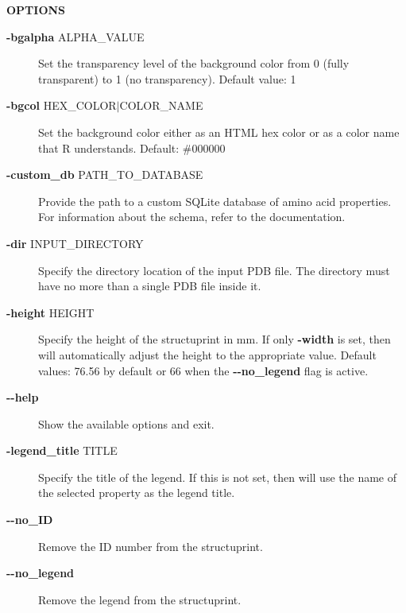 \documentclass[12pt,a4paper]{article}
\begin{document}
\textbf{\large{OPTIONS}}
\begin{description}

\item[{\textbf{-bgalpha} ALPHA\_VALUE}] \mbox{}

Set the transparency level of the background color from 0 (fully transparent) to 1 (no transparency). Default value: 1

\item[{\textbf{-bgcol} HEX\_COLOR$|$COLOR\_NAME}] \mbox{}

Set the background color either as an HTML hex color or as a color name that R understands. Default: \#000000

\item[{\textbf{-custom\_db} PATH\_TO\_DATABASE}] \mbox{}

Provide the path to a custom SQLite database of amino acid properties. For information about the schema, refer to the documentation.

\item[{\textbf{-dir} INPUT\_DIRECTORY}] \mbox{}

Specify the directory location of the input PDB file. The directory must have no more than a single PDB file inside it.

\item[{\textbf{-height} HEIGHT}] \mbox{}

Specify the height of the structuprint in mm. If only \textbf{-width} is set, then  will automatically adjust the height to the appropriate value. Default values: 76.56 by default or 66 when the \textbf{-{}-no\_legend} flag is active.

\item[{\textbf{-{}-help}}] \mbox{}

Show the available options and exit.

\item[{\textbf{-legend\_title} TITLE}] \mbox{}

Specify the title of the legend. If this is not set, then  will use the name of the selected property as the legend title.

\item[{\textbf{-{}-no\_ID}}] \mbox{}

Remove the ID number from the structuprint.

\item[{\textbf{-{}-no\_legend}}] \mbox{}

Remove the legend from the structuprint.


\end{description}
\end{document}
